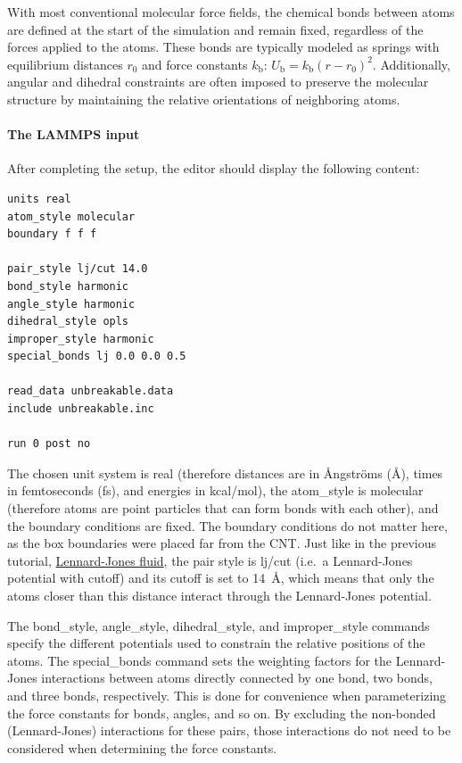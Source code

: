 \documentclass[9pt,tutorial]{livecoms}
\newcommand{\lmpcmd}[1]{\hspace{0pt}\colorbox{listing}{\textcolor{command}{\small{#1}}}\hspace{0pt}} %
\begin{document}
With most conventional molecular force fields, the chemical bonds between
atoms are defined at the start of the simulation and remain fixed, regardless
of the forces applied to the atoms.  These bonds are typically modeled as springs
with equilibrium distances $r_0$ and force constants $k_\text{b}$:
$U_\text{b} = k_\text{b} \left( r - r_0 \right)^2$.  Additionally, angular and
dihedral constraints are often imposed to preserve the molecular structure
by maintaining the relative orientations of neighboring atoms.

\paragraph{The LAMMPS input}

After completing the setup, the editor should display the following content:
\begin{lstlisting}
units real
atom_style molecular
boundary f f f

pair_style lj/cut 14.0
bond_style harmonic
angle_style harmonic
dihedral_style opls
improper_style harmonic
special_bonds lj 0.0 0.0 0.5

read_data unbreakable.data
include unbreakable.inc

run 0 post no
\end{lstlisting}
The chosen unit system is \lmpcmd{real} (therefore distances are in
Ångströms (Å), times in femtoseconds (fs), and energies in kcal/mol), the
\lmpcmd{atom\_style} is \lmpcmd{molecular} (therefore atoms are point
particles that can form bonds with each other), and the boundary
conditions are fixed.  The boundary conditions do not matter here, as
the box boundaries were placed far from the CNT.  Just like in the
previous tutorial, \hyperref[lennard-jones-label]{Lennard-Jones fluid},
the pair style is \lmpcmd{lj/cut} (i.e.~a Lennard-Jones potential with
cutoff) and its cutoff is set to 14~Å, which means that only the
atoms closer than this distance interact through the Lennard-Jones
potential.

The \lmpcmd{bond\_style}, \lmpcmd{angle\_style},
\lmpcmd{dihedral\_style}, and \lmpcmd{improper\_style} commands specify
the different potentials used to constrain the relative positions of the
atoms.  The \lmpcmd{special\_bonds} command sets the weighting factors
for the Lennard-Jones interactions between atoms directly connected by
one bond, two bonds, and three bonds, respectively.  This is done for
convenience when parameterizing the force constants for bonds, angles, and
so on.  By excluding the non-bonded (Lennard-Jones) interactions for
these pairs, those interactions do not need to be considered when determining
the force constants.
\end{document}
